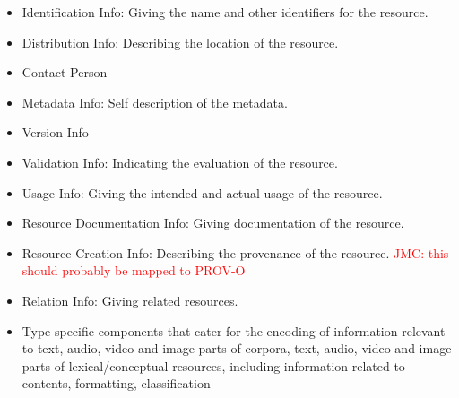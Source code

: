\documentclass{llncs}
\begin{document}
\begin{itemize}
    \item Identification Info: Giving the name and other identifiers for the
        resource.
    \item Distribution Info: Describing the location of the resource.
    \item Contact Person
    \item Metadata Info: Self description of the metadata.
    \item Version Info
    \item Validation Info: Indicating the evaluation of the resource.
    \item Usage Info: Giving the intended and actual usage of the resource.
    \item Resource Documentation Info: Giving documentation of the resource.
    \item Resource Creation Info: Describing the provenance of the resource.
        \textcolor{red}{JMC: this should probably be mapped to PROV-O}
    \item Relation Info: Giving related resources.
    \item Type-specific components that cater for the encoding of information
        relevant to text, audio, video and image parts of corpora, text, audio,
        video and image parts of lexical/conceptual resources, including 
        information related to contents, formatting,
        classification 
\end{itemize}
\end{document}
